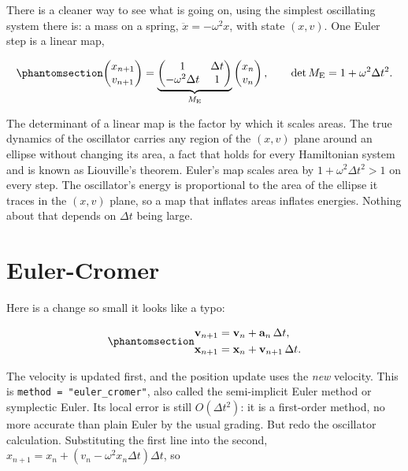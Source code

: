 \documentclass[
  10.5pt,
  letterpaper,
]{scrbook}
\theoremstyle{definition}
\theoremstyle{plain}
\theoremstyle{remark}
\begin{document}
There is a cleaner way to see what is going on, using the simplest
oscillating system there is: a mass on a spring,
\(\ddot{x} = -\omega^2 x\), with state \((x, v)\). One Euler step is a
linear map,

\begin{equation}\protect\phantomsection\label{eq-euler-matrix}{
\begin{pmatrix} x_{n+1} \\ v_{n+1} \end{pmatrix}
= \underbrace{\begin{pmatrix} 1 & \Delta t \\ -\omega^2\Delta t & 1 \end{pmatrix}}_{M_{\mathrm{E}}}
\begin{pmatrix} x_n \\ v_n \end{pmatrix},
\qquad \det M_{\mathrm{E}} = 1 + \omega^2\Delta t^2.
}\end{equation}

The determinant of a linear map is the factor by which it scales areas.
The true dynamics of the oscillator carries any region of the \((x, v)\)
plane around an ellipse without changing its area, a fact that holds for
every Hamiltonian system and is known as Liouville's theorem. Euler's
map scales area by \(1 + \omega^2\Delta t^2 > 1\) on every step. The
oscillator's energy is proportional to the area of the ellipse it traces
in the \((x, v)\) plane, so a map that inflates areas inflates energies.
Nothing about that depends on \(\Delta t\) being large.

\section{Euler-Cromer}\label{euler-cromer}

Here is a change so small it looks like a typo:

\begin{equation}\protect\phantomsection\label{eq-euler-cromer}{
\begin{aligned}
\mathbf{v}_{n+1} &= \mathbf{v}_n + \mathbf{a}_n\,\Delta t, \\
\mathbf{x}_{n+1} &= \mathbf{x}_n + \mathbf{v}_{n+1}\,\Delta t.
\end{aligned}
}\end{equation}

The velocity is updated first, and the position update uses the
\emph{new} velocity. This is \texttt{method\ =\ "euler\_cromer"}, also
called the semi-implicit Euler method or symplectic Euler. Its local
error is still \(O(\Delta t^2)\): it is a first-order method, no more
accurate than plain Euler by the usual grading. But redo the oscillator
calculation. Substituting the first line into the second,
\(x_{n+1} = x_n + (v_n - \omega^2 x_n \Delta t)\Delta t\), so
\end{document}
